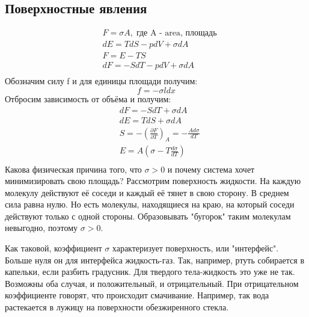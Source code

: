 \documentclass[a4paper, 12pt]{article}
\begin{document}
	\subsection{Поверхностные явления}
	\begin{equation*}
		\begin{aligned}
			& F = \sigma A, \; \text{где A - area, площадь} \\
			& dE = TdS - pdV+\sigma dA                                \\
			& F = E-TS                                                \\
			& dF = -SdT-pdV + \sigma dA                               \\
		\end{aligned}
	\end{equation*}
	Обозначим силу f и для единицы площади получим:
	\begin{equation*}
		f = - \sigma l dx
	\end{equation*}
	Отбросим зависимость от объёма и получим:
	\begin{equation*}
		\begin{aligned}
			& dF = -SdT + \sigma dA                                              \\
			& dE = TdS + \sigma dA                                               \\
			& S = -( \frac{\partial F}{\partial T})_{A} = - \frac{Ad \sigma}{dT} \\
			& E = A(\sigma - T \frac{d \sigma}{dT} )                             \\
		\end{aligned}
	\end{equation*}
	Какова физическая причина того, что $\sigma > 0$ и почему система хочет минимизировать свою площадь? Рассмотрим поверхность жидкости. На каждую молекулу действуют её соседи и каждый её тянет в свою сторону. В среднем сила равна нулю. Но есть молекулы, находящиеся на краю, на который соседи действуют только с одной стороны. Образовывать "бугорок" таким молекулам невыгодно, поэтому $\sigma > 0$. 
	
	Как таковой,  коэффициент $\sigma$  характеризует поверхность, или "интерфейс". Больше нуля он для интерфейса жидкость-газ. Так, например, ртуть собирается в капельки, если разбить градусник. Для твердого тела-жидкость это уже не так. Возможны оба случая, и положительный, и отрицательный. При отрицательном коэффициенте говорят, что происходит смачивание. Например, так вода растекается в лужицу на поверхности обезжиренного стекла. 
	
\end{document}
